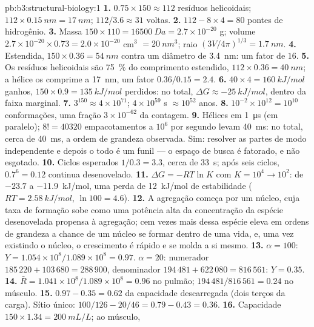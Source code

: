 \begin{solution}{pb:b3:structural-biology:1}
\textbf{1.} $0.75\times 150 \approx 112$ resíduos helicoidais; $112\times
\qty{0.15}{nm} = \qty{17}{nm}$; $112/3.6 \approx 31$ voltas.
\textbf{2.} $112 - 8\times 4 = 80$ pontes de hidrogênio.
\textbf{3.} Massa $150\times 110 = \qty{16500}{Da} = 2.7\times 10^{-20}$
g; volume $2.7\times 10^{-20}\times 0.73 = 2.0\times 10^{-20}$ cm$^{3}$
$= \qty{20}{nm^3}$; raio $(3V/4\pi)^{1/3} = \qty{1.7}{nm}$.
\textbf{4.} Estendida, $150\times 0.36 = \qty{54}{nm}$ contra um
diâmetro de \qty{3.4}{nm}: um fator de $16$.
\textbf{5.} Os resíduos helicoidais são \qty{75}{\%} do comprimento
estendido, $112\times 0.36 = \qty{40}{nm}$; a hélice os comprime a
\qty{17}{nm}, um fator $0.36/0.15 = 2.4$.
\textbf{6.} $40\times 4 = \qty{160}{kJ/mol}$ ganhos, $150\times 0.9 =
\qty{135}{kJ/mol}$ perdidos: no total,
$\Delta G \approx \qty{-25}{kJ/mol}$, dentro da faixa marginal.
\textbf{7.} $3^{150} \approx 4\times 10^{71}$; $4\times 10^{59}$ s
$\approx 10^{52}$ anos.
\textbf{8.} $10^{-2}\times 10^{12} = 10^{10}$ conformações, uma fração
$3\times 10^{-62}$ da contagem.
\textbf{9.} Hélices em \qty{1}{\micro s} (em paralelo); $8! = \num{40320}$
empacotamentos a $10^{6}$ por segundo levam \qty{40}{ms}: no total,
cerca de \qty{40}{ms}, a ordem de grandeza observada. Sim: resolver as
partes de modo independente e depois o todo é um funil --- o espaço de
busca é fatorado, e não esgotado.
\textbf{10.} Ciclos esperados $1/0.3 = 3.3$, cerca de \qty{33}{s}; após
seis ciclos, $0.7^{6} = 0.12$ continua desenovelado.
\textbf{11.} $\Delta G = -RT\ln K$ com $K = 10^{4} \to 10^{2}$: de
$-23.7$ a \qty{-11.9}{kJ/mol}, uma perda de \qty{12}{kJ/mol} de
estabilidade ($RT = \qty{2.58}{kJ/mol}$, $\ln 100 = 4.6$).
\textbf{12.} A agregação começa por um núcleo, cuja taxa de formação
sobe como uma potência alta da concentração da espécie desenovelada
propensa à agregação; cem vezes mais dessa espécie eleva em ordens de
grandeza a chance de um núcleo se formar dentro de uma vida, e, uma vez
existindo o núcleo, o crescimento é rápido e se molda a si mesmo.
\textbf{13.} $\alpha = 100$: $Y = 1.054\times 10^{8}/1.089\times 10^{8} =
0.97$. $\alpha = 20$: numerador $185\,220 + 103\,680 = 288\,900$,
denominador $194\,481 + 622\,080 = 816\,561$: $Y = 0.35$.
\textbf{14.} $\bar R = 1.041\times 10^{8}/1.089\times 10^{8} = 0.96$ no
pulmão; $194\,481/816\,561 = 0.24$ no músculo.
\textbf{15.} $0.97 - 0.35 = 0.62$ da capacidade descarregada (dois
terços da carga). Sítio único: $100/126 - 20/46 = 0.79 - 0.43 = 0.36$.
\textbf{16.} Capacidade $150\times 1.34 = \qty{200}{mL/L}$; ao músculo,

\end{solution}
